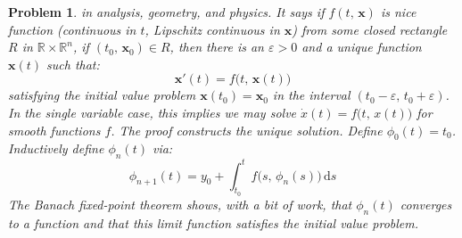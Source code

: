 \documentclass{article}
\theoremstyle{normal}
\newtheorem{problem}{Problem}
\begin{document}
\begin{problem}
        in analysis, geometry, and physics. It says if $f(t,\,\mathbf{x})$ is 
        \textit{nice} function (continuous in $t$, Lipschitz continuous in
        $\mathbf{x}$) from some closed rectangle $R$ in
        $\mathbb{R}\times\mathbb{R}^{n}$, if $(t_{0},\,\mathbf{x}_{0})\in{R}$,
        then there is an $\varepsilon>0$ and
        a unique function $\mathbf{x}(t)$ such that:
        \begin{equation}
            \mathbf{x}'(t)=f\big(t,\,\mathbf{x}(t)\big)
        \end{equation}
        satisfying the initial value problem $\mathbf{x}(t_{0})=\mathbf{x}_{0}$
        in the interval $(t_{0}-\varepsilon,\,t_{0}+\varepsilon)$.
        In the single variable case, this implies we may solve
        $\dot{x}(t)=f\big(t,\,x(t)\big)$ for smooth functions $f$. The proof
        constructs the unique solution. Define
        $\phi_{0}(t)=t_{0}$. Inductively define $\phi_{n}(t)$ via:
        \begin{equation}
            \phi_{n+1}(t)=y_{0}+\int_{t_{0}}^{t}f\big(s,\,\phi_{n}(s)\big)\,
                \textrm{d}s
        \end{equation}
        The Banach fixed-point theorem shows, with a bit of work, that
        $\phi_{n}(t)$ converges to a function and that this limit function
        satisfies the initial value problem.
    \end{problem}
\end{document}
